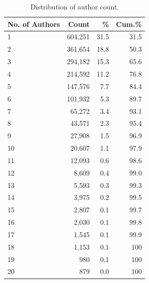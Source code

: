 \documentclass[11pt]{article}
\begin{document}
\begin{table}[htbp]
  \centering
  \normalsize

  \begin{tabular}{@{}lrrr@{}}
    \toprule
    \textbf{No. of Authors} & \textbf{Count} & \% & \textbf{Cum.}\% \\
    \midrule
    1 & 604,251 & 31.5 & 31.5 \\
    2 & 361,654 & 18.8 & 50.3 \\
    3 & 294,182 & 15.3 & 65.6 \\
    4 & 214,592 & 11.2 & 76.8 \\
    5 & 147,576 & 7.7 & 84.4 \\
    6 & 101,932 & 5.3 & 89.7 \\
    7 & 65,272 & 3.4 & 93.1 \\
    8 & 43,571 & 2.3 & 95.4 \\
    9 & 27,908 & 1.5 & 96.9 \\
    10 & 20,607 & 1.1 & 97.9 \\
    11 & 12,093 & 0.6 & 98.6 \\
    12 & 8,609 & 0.4 & 99.0 \\
    13 & 5,593 & 0.3 & 99.3 \\
    14 & 3,975 & 0.2 & 99.5 \\
    15 & 2,807 & 0.1 & 99.7 \\
    16 & 2,030 & 0.1 & 99.8 \\
    17 & 1,545 & 0.1 & 99.9 \\
    18 & 1,153 & 0.1 & 100 \\
    19 & 980 & 0.1 & 100 \\
    20 & 879 & 0.0 & 100 \\
    \bottomrule
  \end{tabular}
    \caption{Distribution of author count.}
  \label{tab:authors-dist}
\end{table}
\end{document}
